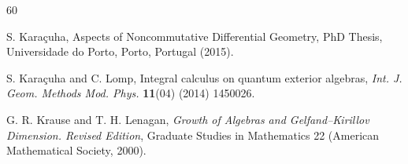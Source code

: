\documentclass{amsart}
\theoremstyle{definition}
\theoremstyle{remark}
\numberwithin{equation}{section}
\begin{document}
\begin{thebibliography}{60}





 S. Kara\c cuha, Aspects of Noncommutative Differential Geometry, PhD Thesis, Universidade do Porto, Porto, Portugal (2015).

S. Kara\c cuha and C. Lomp, Integral calculus on quantum exterior algebras, {\em Int. J. Geom. Methods Mod. Phys.} {\bf 11}(04) (2014) 1450026.




 G. R. Krause and T. H. Lenagan, {\em Growth of Algebras and Gelfand–Kirillov Dimension. Revised Edition}, Graduate Studies in Mathematics 22 (American Mathematical Society, 2000).





\end{thebibliography}
\end{document}
